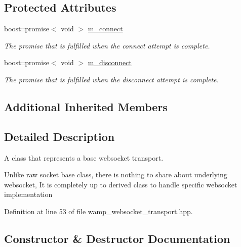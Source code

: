 \subsection*{Protected Attributes}
\begin{DoxyCompactItemize}
\item 
boost\+::promise$<$ void $>$ \hyperlink{classautobahn_1_1wamp__websocket__transport_a40a623b481a8673a709ffe972300e4de}{m\+\_\+connect}\hypertarget{classautobahn_1_1wamp__websocket__transport_a40a623b481a8673a709ffe972300e4de}{}\label{classautobahn_1_1wamp__websocket__transport_a40a623b481a8673a709ffe972300e4de}

\begin{DoxyCompactList}\small\item\em The promise that is fulfilled when the connect attempt is complete. \end{DoxyCompactList}\item 
boost\+::promise$<$ void $>$ \hyperlink{classautobahn_1_1wamp__websocket__transport_ada35715a46031549fac055cc1f77d9d8}{m\+\_\+disconnect}\hypertarget{classautobahn_1_1wamp__websocket__transport_ada35715a46031549fac055cc1f77d9d8}{}\label{classautobahn_1_1wamp__websocket__transport_ada35715a46031549fac055cc1f77d9d8}

\begin{DoxyCompactList}\small\item\em The promise that is fulfilled when the disconnect attempt is complete. \end{DoxyCompactList}\end{DoxyCompactItemize}
\subsection*{Additional Inherited Members}


\subsection{Detailed Description}
A class that represents a base websocket transport. 

Unlike raw socket base class, there is nothing to share about underlying websocket, It is completely up to derived class to handle specific websocket implementation 

Definition at line 53 of file wamp\+\_\+websocket\+\_\+transport.\+hpp.



\subsection{Constructor \& Destructor Documentation}
